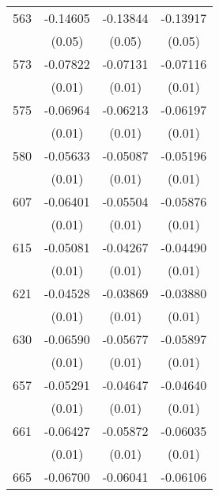 \begin{table}[htbp]
\begin{tabular}{l*{3}{c}}
563                 &    -0.14605\sym{**} &    -0.13844\sym{**} &    -0.13917\sym{**} \\
                    &      (0.05)         &      (0.05)         &      (0.05)         \\
573                 &    -0.07822\sym{***}&    -0.07131\sym{***}&    -0.07116\sym{***}\\
                    &      (0.01)         &      (0.01)         &      (0.01)         \\
575                 &    -0.06964\sym{***}&    -0.06213\sym{***}&    -0.06197\sym{***}\\
                    &      (0.01)         &      (0.01)         &      (0.01)         \\
580                 &    -0.05633\sym{***}&    -0.05087\sym{***}&    -0.05196\sym{***}\\
                    &      (0.01)         &      (0.01)         &      (0.01)         \\
607                 &    -0.06401\sym{***}&    -0.05504\sym{***}&    -0.05876\sym{***}\\
                    &      (0.01)         &      (0.01)         &      (0.01)         \\
615                 &    -0.05081\sym{***}&    -0.04267\sym{***}&    -0.04490\sym{***}\\
                    &      (0.01)         &      (0.01)         &      (0.01)         \\
621                 &    -0.04528\sym{***}&    -0.03869\sym{***}&    -0.03880\sym{***}\\
                    &      (0.01)         &      (0.01)         &      (0.01)         \\
630                 &    -0.06590\sym{***}&    -0.05677\sym{***}&    -0.05897\sym{***}\\
                    &      (0.01)         &      (0.01)         &      (0.01)         \\
657                 &    -0.05291\sym{***}&    -0.04647\sym{***}&    -0.04640\sym{***}\\
                    &      (0.01)         &      (0.01)         &      (0.01)         \\
661                 &    -0.06427\sym{***}&    -0.05872\sym{***}&    -0.06035\sym{***}\\
                    &      (0.01)         &      (0.01)         &      (0.01)         \\
665                 &    -0.06700\sym{***}&    -0.06041\sym{**} &    -0.06106\sym{**} \\

\end{tabular}
\end{table}
